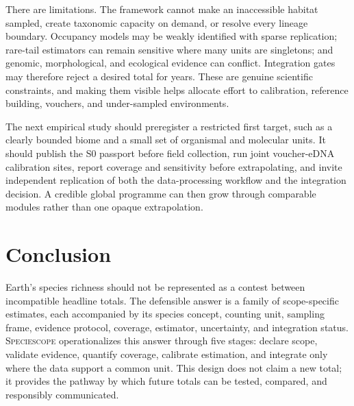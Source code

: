 \documentclass[conference]{IEEEtran}
\newcommand{\specscope}{\textsc{Speciescope}}
\begin{document}
There are limitations. The framework cannot make an inaccessible habitat sampled, create taxonomic capacity on demand, or resolve every lineage boundary. Occupancy models may be weakly identified with sparse replication; rare-tail estimators can remain sensitive where many units are singletons; and genomic, morphological, and ecological evidence can conflict. Integration gates may therefore reject a desired total for years. These are genuine scientific constraints, and making them visible helps allocate effort to calibration, reference building, vouchers, and under-sampled environments.

The next empirical study should preregister a restricted first target, such as a clearly bounded biome and a small set of organismal and molecular units. It should publish the S0 passport before field collection, run joint voucher-eDNA calibration sites, report coverage and sensitivity before extrapolating, and invite independent replication of both the data-processing workflow and the integration decision. A credible global programme can then grow through comparable modules rather than one opaque extrapolation.

\section{Conclusion}

Earth's species richness should not be represented as a contest between incompatible headline totals. The defensible answer is a family of scope-specific estimates, each accompanied by its species concept, counting unit, sampling frame, evidence protocol, coverage, estimator, uncertainty, and integration status. \specscope{} operationalizes this answer through five stages: declare scope, validate evidence, quantify coverage, calibrate estimation, and integrate only where the data support a common unit. This design does not claim a new total; it provides the pathway by which future totals can be tested, compared, and responsibly communicated.
\end{document}
